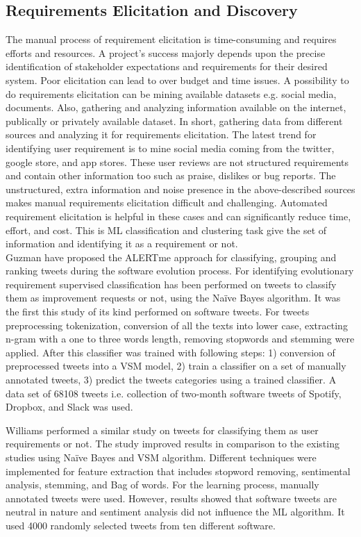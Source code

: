 
\subsection{Requirements Elicitation and Discovery}

The manual process of requirement elicitation is time-consuming and requires
efforts and resources. A project's success majorly depends
upon the precise identification of stakeholder expectations and requirements for their desired
system. Poor elicitation can lead to over budget and time issues.
A possibility to do requirements elicitation can be mining
available datasets e.g. social media, documents. Also, gathering and analyzing information available on the internet,
publically or privately available dataset. In short, gathering data from different
sources and analyzing it for requirements elicitation.  The latest trend for
identifying user requirement is to mine social media coming from the twitter, google store, and app stores. These user reviews are not
structured requirements and contain other information too such as praise,
dislikes or bug reports. The unstructured, extra information and noise
presence in the above-described sources makes manual requirements
elicitation difficult and challenging. Automated requirement elicitation
is helpful in these cases and can significantly reduce time, effort, and cost.
This is ML classification and clustering task give the set of
information and identifying it as a requirement or not.\\

Guzman \etal \cite{Guzman:2017} have proposed the ALERTme approach for
classifying, grouping and ranking tweets during the software evolution
process. For identifying evolutionary requirement supervised classification
has been performed on tweets to classify them as improvement requests or not,
using the Naïve Bayes algorithm. It was the first this study of its kind
performed on software tweets. For tweets preprocessing tokenization, conversion of all the texts into lower case, extracting n-gram with a one to three words length, removing stopwords and stemming were applied. 
After this classifier was trained with following steps:  1) conversion of preprocessed tweets into a VSM model, 2) train a classifier on a set of manually annotated tweets, 3) predict the tweets categories using a trained classifier. A data set of 68108 tweets i.e. collection of two-month software tweets of Spotify, Dropbox, and Slack was used.

Williams \etal \cite{Williams:2017} performed a similar study on tweets for
classifying them as user requirements or not. The study improved
results in comparison to the existing studies using Naïve Bayes and VSM
algorithm. Different techniques were implemented for feature extraction that includes stopword removing, sentimental analysis,
stemming, and Bag of words.
For the learning process, manually annotated tweets were used. However, results showed
that software tweets are neutral in nature and sentiment analysis did not
influence the ML algorithm. It used 4000 randomly selected tweets from ten different software.\\

